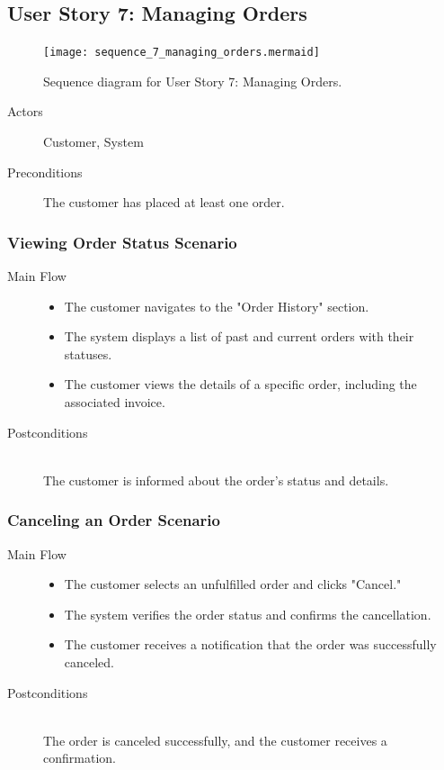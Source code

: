 \documentclass[twoside,a4paper,journal]{IEEEtran}
\begin{document}
\subsection{User Story 7: Managing Orders}
\begin{figure}[!t]
\centering
\texttt{[image: sequence\_7\_managing\_orders.mermaid]}
\caption{Sequence diagram for User Story 7: Managing Orders.}
\label{fig:sequence_7}
\end{figure}
\begin{description}
  \item[Actors] Customer, System
  \item[Preconditions] \hfill
    The customer has placed at least one order.
\end{description}
\subsubsection{Viewing Order Status Scenario}
\begin{description}
  \item[Main Flow] \hfill
    \begin{itemize}
      \item The customer navigates to the "Order History" section.
      \item The system displays a list of past and current orders with their
        statuses.
      \item The customer views the details of a specific order, including the
        associated invoice.
    \end{itemize}
  \item[Postconditions] \hfill \\
    The customer is informed about the order's status and details.
\end{description}
\subsubsection{Canceling an Order Scenario}
\begin{description}
  \item[Main Flow] \hfill
    \begin{itemize}
      \item The customer selects an unfulfilled order and clicks "Cancel."
      \item The system verifies the order status and confirms the cancellation.
      \item The customer receives a notification that the order was successfully
        canceled.
    \end{itemize}
  \item[Postconditions] \hfill \\
    The order is canceled successfully, and the customer receives a
    confirmation.
\end{description}
\end{document}
